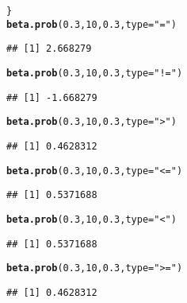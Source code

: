 \documentclass{article}\usepackage[]{graphicx}\usepackage[]{xcolor}
\makeatletter
\newcommand{\hlnum}[1]{\textcolor[rgb]{0.686,0.059,0.569}{#1}}%
\newcommand{\hlsng}[1]{\textcolor[rgb]{0.192,0.494,0.8}{#1}}%
\newcommand{\hldef}[1]{\textcolor[rgb]{0.345,0.345,0.345}{#1}}%
\newcommand{\hlkwc}[1]{\textcolor[rgb]{0.333,0.667,0.333}{#1}}%
\newcommand{\hlkwd}[1]{\textcolor[rgb]{0.737,0.353,0.396}{\textbf{#1}}}%
\newenvironment{kframe}{%
 \def\at@end@of@kframe{}%
 \ifinner\ifhmode%
  \def\at@end@of@kframe{\end{minipage}}%
  \begin{minipage}{\columnwidth}%
 \fi\fi%
 \def\FrameCommand##1{\hskip\@totalleftmargin \hskip-\fboxsep
 \colorbox{shadecolor}{##1}\hskip-\fboxsep
     \hskip-\linewidth \hskip-\@totalleftmargin \hskip\columnwidth}%
 \MakeFramed {\advance\hsize-\width
   \@totalleftmargin\z@ \linewidth\hsize
   \@setminipage}}%
 {\par\unskip\endMakeFramed%
 \at@end@of@kframe}
\newenvironment{knitrout}{}{} %
\makeatother
\begin{document}
\begin{enumerate}
\begin{knitrout}
\begin{kframe}
\begin{alltt}
\hldef{\}}
\hlkwd{beta.prob}\hldef{(}\hlnum{0.3}\hldef{,} \hlnum{10}\hldef{,} \hlnum{0.3}\hldef{,} \hlkwc{type} \hldef{=} \hlsng{"="}\hldef{)}
\end{alltt}
\begin{verbatim}
## [1] 2.668279
\end{verbatim}
\begin{alltt}
\hlkwd{beta.prob}\hldef{(}\hlnum{0.3}\hldef{,} \hlnum{10}\hldef{,} \hlnum{0.3}\hldef{,} \hlkwc{type} \hldef{=} \hlsng{"!="}\hldef{)}
\end{alltt}
\begin{verbatim}
## [1] -1.668279
\end{verbatim}
\begin{alltt}
\hlkwd{beta.prob}\hldef{(}\hlnum{0.3}\hldef{,} \hlnum{10}\hldef{,} \hlnum{0.3}\hldef{,} \hlkwc{type} \hldef{=} \hlsng{">"}\hldef{)}
\end{alltt}
\begin{verbatim}
## [1] 0.4628312
\end{verbatim}
\begin{alltt}
\hlkwd{beta.prob}\hldef{(}\hlnum{0.3}\hldef{,} \hlnum{10}\hldef{,} \hlnum{0.3}\hldef{,} \hlkwc{type} \hldef{=} \hlsng{"<="}\hldef{)}
\end{alltt}
\begin{verbatim}
## [1] 0.5371688
\end{verbatim}
\begin{alltt}
\hlkwd{beta.prob}\hldef{(}\hlnum{0.3}\hldef{,} \hlnum{10}\hldef{,} \hlnum{0.3}\hldef{,} \hlkwc{type} \hldef{=} \hlsng{"<"}\hldef{)}
\end{alltt}
\begin{verbatim}
## [1] 0.5371688
\end{verbatim}
\begin{alltt}
\hlkwd{beta.prob}\hldef{(}\hlnum{0.3}\hldef{,} \hlnum{10}\hldef{,} \hlnum{0.3}\hldef{,} \hlkwc{type} \hldef{=} \hlsng{">="}\hldef{)}
\end{alltt}
\begin{verbatim}
## [1] 0.4628312
\end{verbatim}
\end{kframe}
\end{knitrout}
\end{enumerate}

\end{document}
